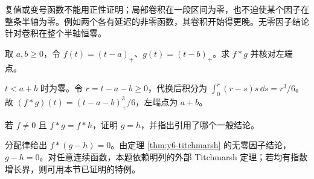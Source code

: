 \begin{remark}[符号抵消的困难]
复值或变号函数不能用正性证明；局部卷积在一段区间为零，也不迫使某个因子在整条半轴为零。例如两个各有延迟的非零函数，其卷积开始得更晚。无零因子结论针对卷积在整个半轴恒零。
\end{remark}

\begin{exercise}[延迟相加]\label{ex:y6-delay}
取 $a,b\ge0$，令 $f(t)=(t-a)_+$、$g(t)=(t-b)_+$。求 $f*g$ 并核对左端点。
\end{exercise}
\begin{solution}
$t<a+b$ 时为零。令 $r=t-a-b\ge0$，代换后积分为 $\int_0^r(r-s)s\,\dd s=r^3/6$。故 $(f*g)(t)=(t-a-b)_+^3/6$，左端点为 $a+b$。
\end{solution}

\begin{exercise}[取消律]\label{ex:y6-cancellation}
若 $f\ne0$ 且 $f*g=f*h$，证明 $g=h$，并指出引用了哪个一般结论。
\end{exercise}
\begin{solution}
分配律给出 $f*(g-h)=0$。由定理 \ref{thm:y6-titchmarsh} 的无零因子结论，$g-h=0$。对任意连续函数，本题依赖明列的外部 Titchmarsh 定理；若均有指数增长界，则可用本节已证明的特例。
\end{solution}
